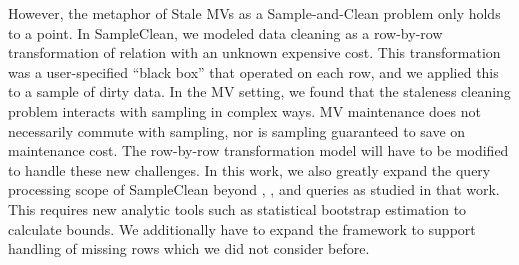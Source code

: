 However, the metaphor of Stale MVs as a Sample-and-Clean problem only holds to a point.
In SampleClean, we modeled data cleaning as a row-by-row transformation of relation with an unknown expensive cost. 
This transformation was a user-specified  ``black box'' that operated on each row, and we applied this to a sample of dirty data.
In the MV setting, we found that the staleness cleaning problem interacts with sampling in complex ways. 
MV maintenance does not necessarily commute with sampling, nor is sampling guaranteed to save on maintenance cost.
The row-by-row transformation model will have to be modified to handle these new challenges. 
In this work, we also greatly expand the query processing scope of SampleClean beyond \sumfunc, \countfunc, and \avgfunc queries as studied in that work.
This requires new analytic tools such as statistical bootstrap estimation to calculate bounds.
We additionally have to expand the framework to support handling of missing rows which we did not consider before.

